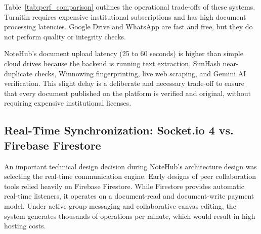 \documentclass[12,Times new Roman,a4paper]{report}
\renewcommand{\arraystretch}{1.5} %
\begin{document}
\begin{table}[htbp]
\centering
\renewcommand{\arraystretch}{1.5}
\caption{Operational Cost, Accessibility, and Latency Comparison}
\label{tab:perf_comparison}
\end{table}

Table~\ref{tab:perf_comparison} outlines the operational trade-offs of these systems. Turnitin requires expensive institutional subscriptions and has high document processing latencies. Google Drive and WhatsApp are fast and free, but they do not perform quality or integrity checks. 

NoteHub's document upload latency (25 to 60 seconds) is higher than simple cloud drives because the backend is running text extraction, SimHash near-duplicate checks, Winnowing fingerprinting, live web scraping, and Gemini AI verification. This slight delay is a deliberate and necessary trade-off to ensure that every document published on the platform is verified and original, without requiring expensive institutional licenses.

\subsection{Real-Time Synchronization: Socket.io 4 vs. Firebase Firestore}
An important technical design decision during NoteHub's architecture design was selecting the real-time communication engine. Early designs of peer collaboration tools relied heavily on Firebase Firestore. While Firestore provides automatic real-time listeners, it operates on a document-read and document-write payment model. Under active group messaging and collaborative canvas editing, the system generates thousands of operations per minute, which would result in high hosting costs. 
\end{document}
